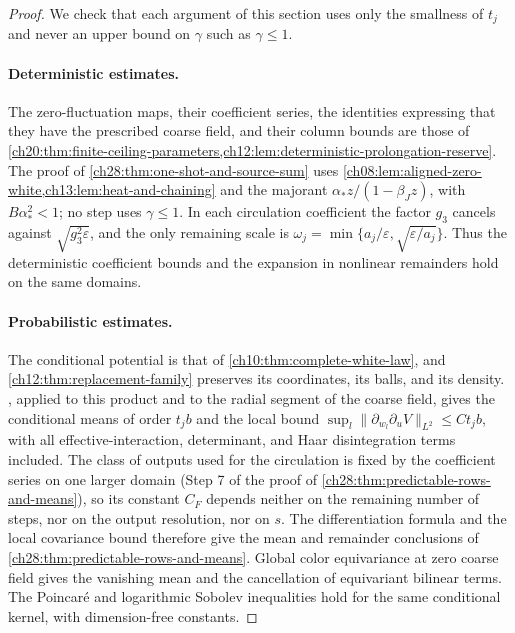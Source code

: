 \begin{proof}
We check that each argument of this section uses only the smallness of $t_j$ and never an upper bound on $\gamma$ such as $\gamma\le1$.

\paragraph{Deterministic estimates.}
The zero-fluctuation maps, their coefficient series, the identities expressing that they have the prescribed coarse field, and their column bounds are those of \cref{ch20:thm:finite-ceiling-parameters,ch12:lem:deterministic-prolongation-reserve}. The proof of \cref{ch28:thm:one-shot-and-source-sum} uses \cref{ch08:lem:aligned-zero-white,ch13:lem:heat-and-chaining} and the majorant $\alpha_*z/(1-\beta_Jz)$, with $B\alpha_*^2<1$; no step uses $\gamma\le1$. In each circulation coefficient the factor $g_3$ cancels against $\sqrt{g_3^2\varepsilon}$, and the only remaining scale is $\omega_j=\min\{a_j/\varepsilon,\sqrt{\varepsilon/a_j}\}$. Thus the deterministic coefficient bounds and the expansion in nonlinear remainders hold on the same domains.

\paragraph{Probabilistic estimates.}
The conditional potential is that of \cref{ch10:thm:complete-white-law}, and \cref{ch12:thm:replacement-family} preserves its coordinates, its balls, and its density. , applied to this product and to the radial segment of the coarse field, gives the conditional means of order $t_jb$ and the local bound $\sup_l\|\partial_{w_l}\partial_uV\|_{L^2}\le Ct_jb$, with all effective-interaction, determinant, and Haar disintegration terms included. The class of outputs used for the circulation is fixed by the coefficient series on one larger domain (Step 7 of the proof of \cref{ch28:thm:predictable-rows-and-means}), so its constant $C_F$ depends neither on the remaining number of steps, nor on the output resolution, nor on $s$. The differentiation formula and the local covariance bound therefore give the mean and remainder conclusions of \cref{ch28:thm:predictable-rows-and-means}. Global color equivariance at zero coarse field gives the vanishing mean and the cancellation of equivariant bilinear terms. The Poincaré and logarithmic Sobolev inequalities hold for the same conditional kernel, with dimension-free constants.


\end{proof}
